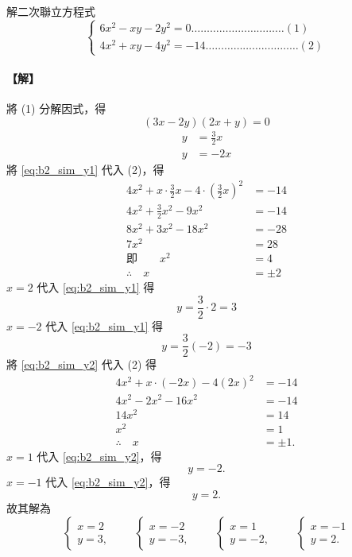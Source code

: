 \begin{example}\label{ex:b2_1-4-5}
解二次聯立方程式
\[
\begin{cases}
6x^2-xy-2y^2=0 \dots\dots\dots\dots\dots\dots\dots\dots\dots\dots (1) \\
4x^2+xy-4y^2=-14 \dots\dots\dots\dots\dots\dots\dots\dots\dots\dots (2)
\end{cases}
\]
\end{example}
\paragraph{【解】}
將 (1) 分解因式，得
\[
(3x-2y)(2x+y)=0
\]
\begin{align}
y &= \frac{3}{2}x \tag{3}\label{eq:b2_sim_y1} \\
y &= -2x \tag{4}\label{eq:b2_sim_y2}
\end{align}
將 \eqref{eq:b2_sim_y1} 代入 (2)，得
\begin{align*}
4x^2+x\cdot \frac{3}{2}x - 4\cdot \left(\frac{3}{2}x\right)^2 &= -14 \\
4x^2+\frac{3}{2}x^2-9x^2 &= -14 \\
8x^2+3x^2-18x^2 &= -28 \\
7x^2 &= 28 \\
\text{即}\qquad x^2 &= 4 \\
\therefore\quad x &= \pm 2
\end{align*}
$x=2$ 代入 \eqref{eq:b2_sim_y1} 得
\[
y = \frac{3}{2}\cdot 2 = 3
\]
$x=-2$ 代入 \eqref{eq:b2_sim_y1} 得
\[
y = \frac{3}{2}(-2) = -3
\]
將 \eqref{eq:b2_sim_y2} 代入 (2) 得
\begin{align*}
4x^2+x\cdot(-2x)-4(2x)^2 &= -14 \\
4x^2-2x^2-16x^2 &= -14 \\
14x^2 &= 14 \\
x^2 &= 1 \\
\therefore\quad x &= \pm 1.
\end{align*}
$x=1$ 代入 \eqref{eq:b2_sim_y2}，得
\[
y = -2.
\]
$x=-1$ 代入 \eqref{eq:b2_sim_y2}，得
\[
y = 2.
\]
故其解為
\[
\begin{cases} x=2 \\ y=3, \end{cases}\qquad
\begin{cases} x=-2 \\ y=-3, \end{cases}\qquad
\begin{cases} x=1 \\ y=-2, \end{cases}\qquad
\begin{cases} x=-1 \\ y=2. \end{cases}
\]


